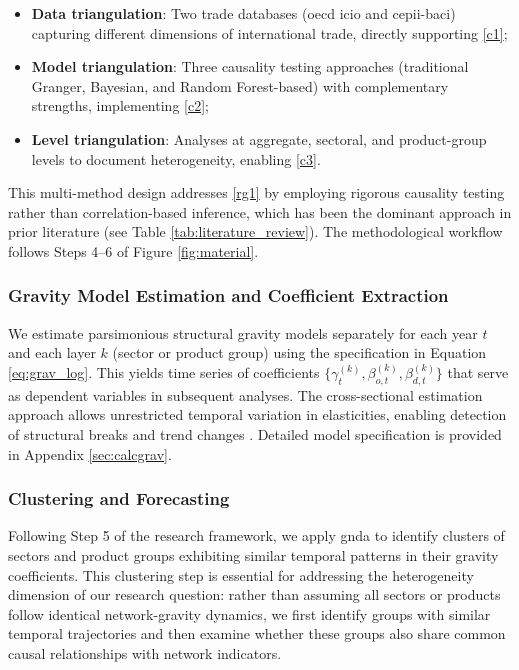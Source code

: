 \documentclass[preprint, 3p,
authoryear]{elsarticle} %
\begin{document}
\begin{itemize}
    \item \textbf{Data triangulation}: Two trade databases (\gls{oecd} \gls{icio} and \gls{cepii}-\gls{baci}) capturing different dimensions of international trade, directly supporting \ref{c1};
    \item \textbf{Model triangulation}: Three causality testing approaches (traditional Granger, Bayesian, and Random Forest-based) with complementary strengths, implementing \ref{c2};
    \item \textbf{Level triangulation}: Analyses at aggregate, sectoral, and product-group levels to document heterogeneity, enabling \ref{c3}.
\end{itemize}

This multi-method design addresses \ref{rg1} by employing rigorous
causality testing rather than correlation-based inference, which has
been the dominant approach in prior literature (see Table
\ref{tab:literature_review}). The methodological workflow follows Steps
4--6 of Figure \ref{fig:material}.

\subsubsection{Gravity Model Estimation and Coefficient
Extraction}\label{gravity-model-estimation-and-coefficient-extraction}

We estimate parsimonious structural gravity models separately for each
year \(t\) and each layer \(k\) (sector or product group) using the
specification in Equation \eqref{eq:grav_log}. This yields time series
of coefficients
\(\{\gamma_t^{(k)}, \beta_{o,t}^{(k)}, \beta_{d,t}^{(k)}\}\) that serve
as dependent variables in subsequent analyses. The cross-sectional
estimation approach allows unrestricted temporal variation in
elasticities, enabling detection of structural breaks and trend changes
\citep{disdier2008,yotov2012}. Detailed model specification is provided
in Appendix \ref{sec:calcgrav}.

\subsubsection{Clustering and
Forecasting}\label{clustering-and-forecasting}

Following Step 5 of the research framework, we apply \gls{gnda}
\citep{kosztyan2024generalized} to identify clusters of sectors and
product groups exhibiting similar temporal patterns in their gravity
coefficients. This clustering step is essential for addressing the
heterogeneity dimension of our research question: rather than assuming
all sectors or products follow identical network-gravity dynamics, we
first identify groups with similar temporal trajectories and then
examine whether these groups also share common causal relationships with
network indicators.
\end{document}
